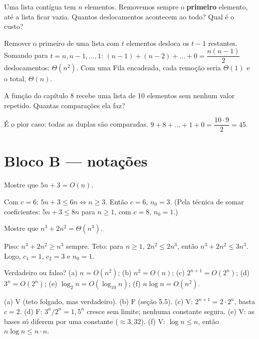 Uma lista contígua tem $n$ elementos. Removemos sempre o \textbf{primeiro} elemento, até a lista
ficar vazia. Quantos deslocamentos acontecem ao todo? Qual é o custo?
\begin{resolucao}
Remover o primeiro de uma lista com $t$ elementos desloca os $t - 1$ restantes. Somando para
$t = n, n-1, \dots, 1$: $(n-1) + (n-2) + \dots + 0 = \dfrac{n(n-1)}{2}$ deslocamentos: $\Theta(n^2)$.
Com uma Fila encadeada, cada remoção seria $\Theta(1)$ e o total, $\Theta(n)$.
\end{resolucao}

A função  do capítulo 8 recebe uma lista de 10 elementos sem nenhum
valor repetido. Quantas comparações ela faz?
\begin{resolucao}
É o pior caso: todas as duplas são comparadas. $9 + 8 + \dots + 1 + 0 = \dfrac{10 \cdot 9}{2} = 45$.
\end{resolucao}

\section{Bloco B — notações}

Mostre que $5n + 3 = O(n)$.
\begin{resolucao}
Com $c = 6$: $5n + 3 \le 6n \Longleftrightarrow n \ge 3$. Então $c = 6$, $n_0 = 3$. (Pela técnica
de somar coeficientes: $5n + 3 \le 8n$ para $n \ge 1$, com $c = 8$, $n_0 = 1$.)
\end{resolucao}

Mostre que $n^3 + 2n^2 = \Theta(n^3)$.
\begin{resolucao}
Piso: $n^3 + 2n^2 \ge n^3$ sempre. Teto: para $n \ge 1$, $2n^2 \le 2n^3$, então
$n^3 + 2n^2 \le 3n^3$. Logo, $c_1 = 1$, $c_2 = 3$ e $n_0 = 1$.
\end{resolucao}

Verdadeiro ou falso? (a) $n = O(n^2)$; (b) $n^2 = O(n)$; (c) $2^{n+1} = O(2^n)$;
(d) $3^n = O(2^n)$; (e) $\log_2 n = O(\log_{10} n)$; (f) $n \log n = O(n^2)$.
\begin{resolucao}
(a) V (teto folgado, mas verdadeiro). (b) F (seção 5.5). (c) V: $2^{n+1} = 2 \cdot 2^n$, basta
$c = 2$. (d) F: $3^n / 2^n = 1{,}5^n$ cresce sem limite; nenhuma constante segura. (e) V: as bases
só diferem por uma constante ($\approx 3{,}32$). (f) V: $\log n \le n$, então $n \log n \le n \cdot n$.
\end{resolucao}

